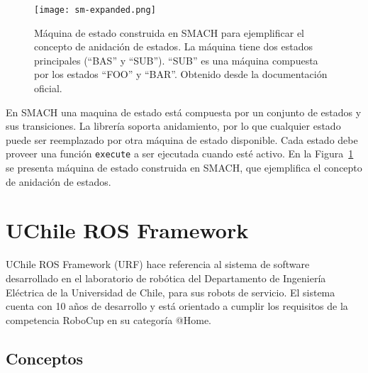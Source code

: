 \begin{figure}[!h]
	\centering
	\texttt{[image: sm-expanded.png]}
	\caption{\small Máquina de estado construida en SMACH para ejemplificar el concepto de anidación de estados. La máquina tiene dos estados principales (``BAS'' y ``SUB''). ``SUB'' es una máquina compuesta por los estados ``FOO'' y ``BAR''.  Obtenido desde la documentación oficial.}
	\label{img:SMACH-sample}
\end{figure}

En SMACH una maquina de estado está compuesta por un conjunto de estados y sus transiciones. La librería soporta anidamiento, por lo que cualquier estado puede ser reemplazado por otra máquina de estado disponible. Cada estado debe proveer una función \texttt{execute} a ser ejecutada cuando esté activo. En la Figura~\ref{img:SMACH-sample} se presenta máquina de estado construida en SMACH, que ejemplifica el concepto de anidación de estados.


\section{UChile ROS Framework}\label{sec:URF}

UChile ROS Framework (URF) hace referencia al sistema de software desarrollado en el laboratorio de robótica del Departamento de Ingeniería Eléctrica de la Universidad de Chile, para sus robots de servicio. El sistema cuenta con 10 años de desarrollo y está orientado a cumplir los requisitos de la competencia RoboCup en su categoría @Home.

\subsection{Conceptos}


